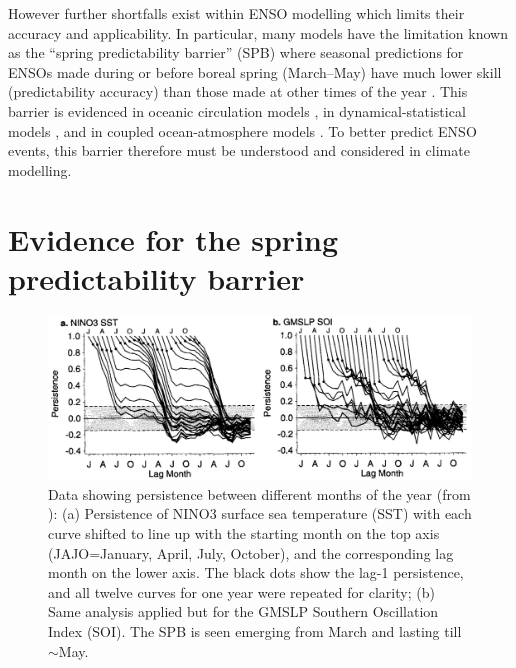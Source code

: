 \documentclass[12pt, onecolumn]{revtex4}    %
\begin{document}
However further shortfalls exist within ENSO modelling which limits their accuracy and applicability. In particular, many models have the limitation known as the ``spring predictability barrier'' (SPB) where seasonal predictions for ENSOs made during or before boreal spring (March--May) have much lower skill (predictability accuracy) than those made at other times of the year \citep{torrence1998annual}. This barrier is evidenced in oceanic circulation models \citep{latif1992much}, in dynamical-statistical models \citep{balmaseda1994enso}, and in coupled ocean-atmosphere models \citep{goswami1991predictability, xue1994prediction}. To better predict ENSO events, this barrier therefore must be understood and considered in climate modelling.

\section{Evidence for the spring predictability barrier}

\begin{figure}
\includegraphics[width=\textwidth]{data/persistence_sst_soi}
\caption[Persistence]{Data showing persistence between different months of the year (from \citealt{torrence1998annual}): (a) Persistence of NINO3 surface sea temperature (SST) with each curve shifted to line up with the starting month on the top axis (JAJO=January, April, July, October), and the corresponding lag month on the lower axis. The black dots show the lag-1 persistence, and all twelve curves for one year were repeated for clarity; (b) Same analysis applied but for the GMSLP Southern Oscillation Index (SOI). The SPB is seen emerging from March and lasting till $\sim$May.}
\label{fig:persistence_sst_soi}
\end{figure}
\end{document}

